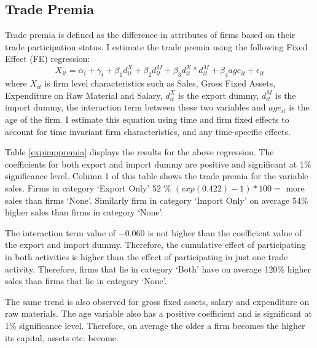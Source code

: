 \documentclass[12pt]{article}
\begin{document}
\subsection{Trade Premia}
Trade premia is defined as the difference in
attributes of firms based on their trade participation status. I
estimate the trade premia using the following Fixed Effect (FE) regression:
\begin{equation}
\label{FE}
 X_{it} = \alpha_i + \gamma_{t} + \beta_{1} d_{it}^{X}+ \beta_{2} d_{it}^{M}+
\beta_{3} d_{it}^{X}*d_{it}^{M} + \beta_{4} age_{it} + \epsilon_{it}
\end{equation}
where $X_{it}$ is firm level characteristics such as Sales, Gross
Fixed Assets, Expenditure on Raw Material and Salary, $d_{it}^X$ is
the export dummy, $d_{it}^M$ is
the import  dummy, the interaction term between these two variables
and $age_{it}$ is the age of the firm. I estimate this equation using
time and firm fixed
effects to account for time invariant firm characteristics, and any
time-specific effects.


\begin{center}

\end{center}

Table \ref{expimppremia} displays the results for the above
regression. The coefficients for both export and import dummy are positive
and significant at 1\% significance level. Column 1 of this table
shows the trade premia for the variable sales. Firms
in category `Export Only'   52 \% $(exp(0.422) -1)* 100 = $ more
sales than firms `None'. Similarly firm in category `Import Only'
on average 54\% higher sales than firms in category `None'. 

 The interaction term value of $-0.060$ is not higher than the coefficient
value of the export and import dummy. Therefore, the cumulative
effect of participating in both activities is higher than the effect
of participating in just one trade activity. Therefore, firms that lie
in category `Both' have  on average 120\% higher sales than firms that
lie in category `None'. 

 The same trend
is also observed for  gross fixed assets, salary and expenditure on
raw materials.  The age variable also
has a positive coefficient and is significant at 1\% significance
level. Therefore,  on average the older a firm becomes the higher its capital,
assets etc. become. 
\end{document}
